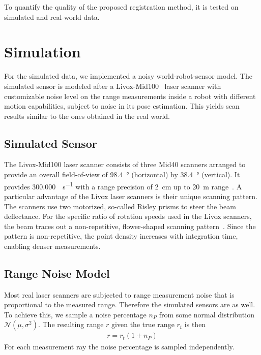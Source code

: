 To quantify the quality of the proposed registration method, it is tested on simulated and real-world data. 

\section{Simulation}

For the simulated data, we implemented a noisy world-robot-sensor model.  
The simulated sensor is modeled after a Livox-Mid100~\cite{LivoxMid40-100} laser scanner with customizable noise level on the range measurements inside a robot with different motion capabilities, subject to noise in its pose estimation. 
This yields scan results similar to the ones obtained in the real world.

\subsection{Simulated Sensor}

The Livox-Mid100 laser scanner consists of three Mid40 scanners arranged to provide an overall field-of-view of \SI{98.4}{\degree} (horizontal) by \SI{38.4}{\degree} (vertical).
It provides \SI[per-mode=symbol]{300,000}{\pts\per\second} with a range precision of \SI{2}{\centi\meter} up to \SI{20}{\meter} range~\cite{LivoxMid40-100}.
A particular advantage of the Livox laser scanners is their unique scanning pattern.
The scanners use two motorized, so-called Risley prisms to steer the beam deflectance.
For the specific ratio of rotation speeds used in the Livox scanners, the beam traces out a non-repetitive, flower-shaped scanning pattern~\cite{thorlabs}.
Since the pattern is non-repetitive, the point density increases with integration time, enabling denser measurements.

\subsection{Range Noise Model}

Most real laser scanners are subjected to range measurement noise that is proportional to the measured range. 
Therefore the simulated sensors are as well. 
To achieve this, we sample a noise percentage $n_P$ from some normal distribution $\mathcal{N}(\mu,\sigma^2)$. 
The resulting range $r$ given the true range $r_t$ is then
\begin{align}
	r = r_t(1+n_P)
\end{align}
For each measurement ray the noise percentage is sampled independently. 

